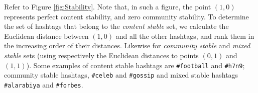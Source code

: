 Refer to Figure \ref{fig:Stability}.  Note that, in such a figure, the point $(1,0)$ represents perfect content stability, and zero community
stability.  To determine the set of hashtags that belong to the \emph{content stable} set, we calculate the Euclidean distance between
$(1,0)$ and all the other hashtags, and rank them in the increasing order of their distances.  Likewise for \emph{community stable} and
\emph{mixed stable} sets (using respectively the Euclidean distances to points $(0,1)$ and $(1,1)$).  
Some examples of content stable hashtags are \texttt{\#football} and \texttt{\#h7n9}; community stable hashtags,
\texttt{\#celeb} and \texttt{\#gossip} and mixed stable hashtags \texttt{\#alarabiya} and \texttt{\#forbes}.
\vspace{-0.2cm}
